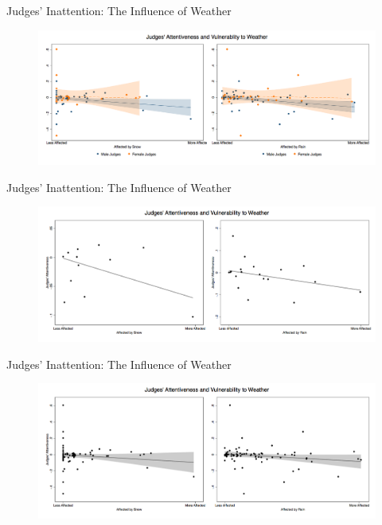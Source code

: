 \begin{frame}{Judges' Inattention: The Influence of Weather}
    \begin{figure}
        \centering
        \includegraphics[height = 0.7 \textheight]{images/weather.png}
    \end{figure}
\end{frame}

\begin{frame}{Judges' Inattention: The Influence of Weather}
    \begin{figure}
        \centering
        \includegraphics[height = 0.7 \textheight]{images/weather_bin.png}
    \end{figure}
\end{frame}

\begin{frame}{Judges' Inattention: The Influence of Weather}
    \begin{figure}
        \centering
        \includegraphics[height = 0.7 \textheight]{images/weather_all.png}
    \end{figure}
\end{frame}
